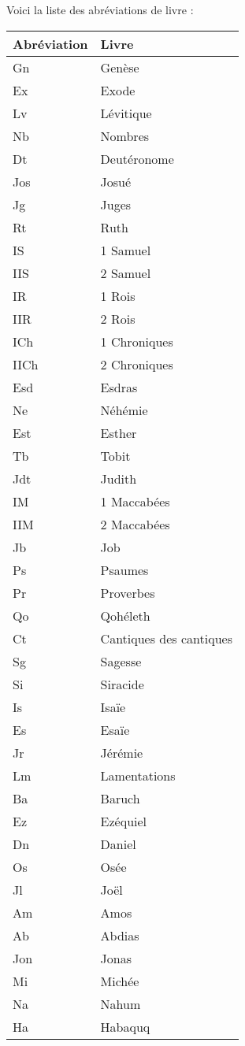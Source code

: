 Voici la liste des abréviations de livre :

\begin{longtable}{|l|l|}
\hline
Abréviation & Livre \\
\hline
\endhead
\hline
\endfoot
Gn	&	Genèse\\
Ex	&	Exode\\
Lv	&	Lévitique\\
Nb	&	Nombres\\
Dt	&	Deutéronome\\
Jos	&	Josué\\
Jg	&	Juges\\
Rt	&	Ruth\\
IS	&	1 Samuel\\
IIS	&	2 Samuel\\
IR	&	1 Rois\\
IIR	&	2 Rois\\
ICh	&	1 Chroniques\\
IICh	&	2 Chroniques\\
Esd	&	Esdras\\
Ne	&	Néhémie\\
Est	&	Esther\\
Tb	&	Tobit\\
Jdt	&	Judith\\
IM	&	1 Maccabées\\
IIM	&	2 Maccabées\\
Jb	&	Job\\
Ps	&	Psaumes\\
Pr	&	Proverbes\\
Qo	&	Qohéleth\\
Ct	&	Cantiques des cantiques\\
Sg	&	Sagesse\\
Si	&	Siracide\\
Is	&	Isaïe\\
Es	&	Esaïe\\
Jr	&	Jérémie\\
Lm	&	Lamentations\\
Ba	&	Baruch\\
Ez	&	Ezéquiel\\
Dn	&	Daniel\\
Os	&	Osée\\
Jl	&	Joël\\
Am	&	Amos\\
Ab	&	Abdias\\
Jon	&	Jonas\\
Mi	&	Michée\\
Na	&	Nahum\\
Ha	&	Habaquq\\

\end{longtable}
